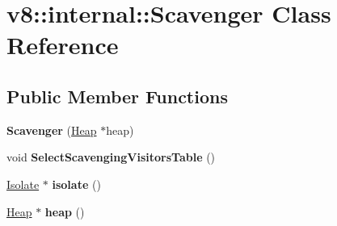 \hypertarget{classv8_1_1internal_1_1_scavenger}{}\section{v8\+:\+:internal\+:\+:Scavenger Class Reference}
\label{classv8_1_1internal_1_1_scavenger}
\subsection*{Public Member Functions}
\begin{DoxyCompactItemize}
\item 
{\bfseries Scavenger} (\hyperlink{classv8_1_1internal_1_1_heap}{Heap} $\ast$heap)\hypertarget{classv8_1_1internal_1_1_scavenger_a8d8e92b63addc352c31e35c3a4a7fb96}{}\label{classv8_1_1internal_1_1_scavenger_a8d8e92b63addc352c31e35c3a4a7fb96}

\item 
void {\bfseries Select\+Scavenging\+Visitors\+Table} ()\hypertarget{classv8_1_1internal_1_1_scavenger_a838905d98c6abaef5a15b2c0807a6eac}{}\label{classv8_1_1internal_1_1_scavenger_a838905d98c6abaef5a15b2c0807a6eac}

\item 
\hyperlink{classv8_1_1internal_1_1_isolate}{Isolate} $\ast$ {\bfseries isolate} ()\hypertarget{classv8_1_1internal_1_1_scavenger_aab5bbd1f944d3f66308b8bfedff2c496}{}\label{classv8_1_1internal_1_1_scavenger_aab5bbd1f944d3f66308b8bfedff2c496}

\item 
\hyperlink{classv8_1_1internal_1_1_heap}{Heap} $\ast$ {\bfseries heap} ()\hypertarget{classv8_1_1internal_1_1_scavenger_a2390c2e547191bca6cd1d26aa94abd8f}{}\label{classv8_1_1internal_1_1_scavenger_a2390c2e547191bca6cd1d26aa94abd8f}

\end{DoxyCompactItemize}
